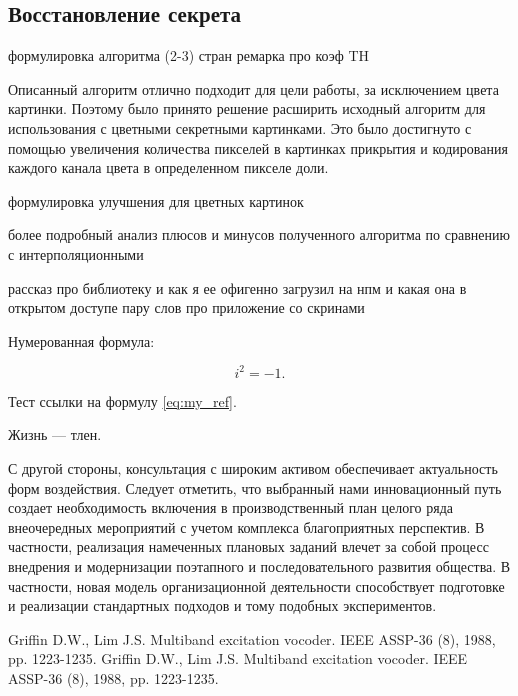 \documentclass[a4paper,article,14pt]{extarticle}
\begin{document}
\subsection{Восстановление секрета}


формулировка алгоритма (2-3) стран
ремарка про коэф TH


Описанный алгоритм отлично подходит для цели работы, за исключением цвета картинки. Поэтому
было принято решение расширить исходный алгоритм для использования с цветными секретными картинками. 
Это было достигнуто с помощью увеличения количества пикселей в картинках прикрытия и кодирования каждого канала цвета 
в определенном пикселе доли.

формулировка улучшения для цветных картинок

более подробный анализ плюсов и минусов полученного алгоритма по сравнению с интерполяционными

рассказ про библиотеку и как я ее офигенно загрузил на нпм и какая она в открытом доступе
пару слов про приложение со скринами




Нумерованная формула:

\begin{equation}
    i^2 = -1.
    \label{eq:my_ref}
\end{equation}

Тест ссылки на формулу \ref{eq:my_ref}.


Жизнь --- тлен.
\pagebreak


С другой стороны, консультация с широким активом обеспечивает актуальность форм воздействия. Следует отметить, что выбранный нами инновационный путь создает необходимость включения в производственный план целого ряда внеочередных мероприятий с учетом комплекса благоприятных перспектив. В частности, реализация намеченных плановых заданий влечет за собой процесс внедрения и модернизации поэтапного и последовательного развития общества. В частности, новая модель организационной деятельности способствует подготовке и реализации стандартных подходов и тому подобных экспериментов.

\begin{thebibliography}{1}
 Griffin D.W., Lim J.S. \flqq Multiband excitation vocoder\frqq. IEEE ASSP-36 (8), 1988, pp. 1223-1235.
 Griffin D.W., Lim J.S. \flqq Multiband excitation vocoder\frqq. IEEE ASSP-36 (8), 1988, pp. 1223-1235.
\end{thebibliography}
\end{document}

